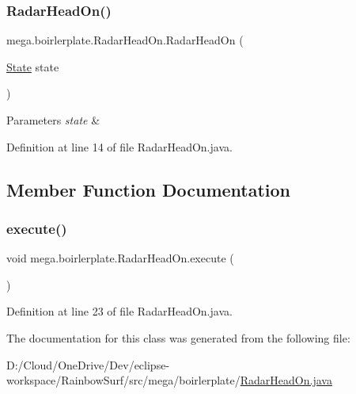 \subsubsection{\texorpdfstring{Radar\+Head\+On()}{RadarHeadOn()}}
{\footnotesize\ttfamily mega.\+boirlerplate.\+Radar\+Head\+On.\+Radar\+Head\+On (\begin{DoxyParamCaption}\item[{\hyperlink{classmega_1_1boirlerplate_1_1_state}{State}}]{state }\end{DoxyParamCaption})}


\begin{DoxyParams}{Parameters}
{\em state} & \\
\hline
\end{DoxyParams}


Definition at line 14 of file Radar\+Head\+On.\+java.



\subsection{Member Function Documentation}
\mbox{\label{classmega_1_1boirlerplate_1_1_radar_head_on_a910654d116a39c27d292835063b30d20}} 
\subsubsection{\texorpdfstring{execute()}{execute()}}
{\footnotesize\ttfamily void mega.\+boirlerplate.\+Radar\+Head\+On.\+execute (\begin{DoxyParamCaption}{ }\end{DoxyParamCaption})}



Definition at line 23 of file Radar\+Head\+On.\+java.



The documentation for this class was generated from the following file\+:\begin{DoxyCompactItemize}
\item 
D\+:/\+Cloud/\+One\+Drive/\+Dev/eclipse-\/workspace/\+Rainbow\+Surf/src/mega/boirlerplate/\hyperlink{_radar_head_on_8java}{Radar\+Head\+On.\+java}\end{DoxyCompactItemize}
